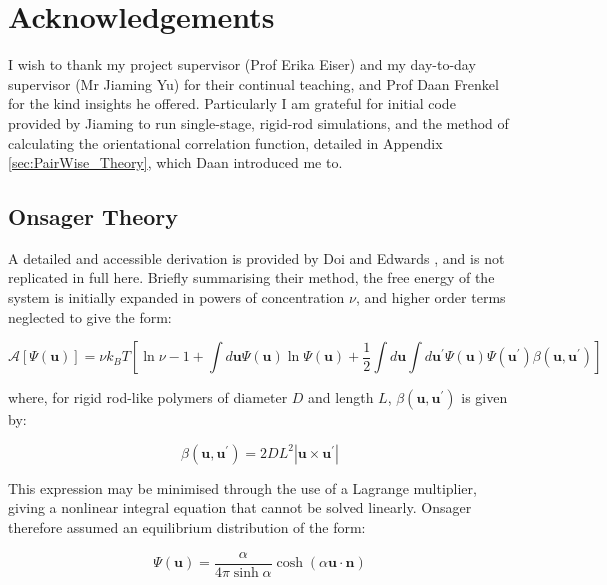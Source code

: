 \documentclass[11pt, a4paper]{article} %
\begin{document}
\section*{Acknowledgements}
I wish to thank my project supervisor (Prof Erika Eiser) and my day-to-day supervisor (Mr Jiaming Yu) for their continual teaching, and Prof Daan Frenkel for the kind insights he offered. Particularly I am grateful for initial code provided by Jiaming to run single-stage, rigid-rod simulations, and the method of calculating the orientational correlation function, detailed in Appendix \ref{sec:PairWise_Theory}, which Daan introduced me to.

\printbibliography

\begin{appendices}

\section{Onsager Theory} \label{sec:OnsagerAppendix}
A detailed and accessible derivation is provided by Doi and Edwards \cite{Doi1988}, and is not replicated in full here. Briefly summarising their method, the free energy of the system is initially expanded in powers of concentration $\nu$, and higher order terms neglected to give the form:

\begin{equation} \label{eq:OnsagerFreeEnergy}
\mathcal{A}[\Psi(\boldsymbol{u})] = \nu k_{B}T \left[ \ln\nu - 1 + \int d\boldsymbol{u} \Psi(\boldsymbol{u}) \ln \Psi(\boldsymbol{u}) + \frac{1}{2} \int d\boldsymbol{u} \int d\boldsymbol{u^{\prime}} \Psi(\boldsymbol{u}) \Psi(\boldsymbol{u^{\prime}}) \beta(\boldsymbol{u}, \boldsymbol{u^{\prime}})  \right]
\end{equation}

where, for rigid rod-like polymers of diameter $D$ and length $L$, $\beta(\boldsymbol{u}, \boldsymbol{u^{\prime}})$ is given by:

\begin{equation}
\beta(\boldsymbol{u}, \boldsymbol{u^{\prime}}) = 2DL^{2} \left\lvert \boldsymbol{u} \times \boldsymbol{u^{\prime}} \right\rvert
\end{equation} 

This expression may be minimised through the use of a Lagrange multiplier, giving a nonlinear integral equation that cannot be solved linearly. Onsager therefore assumed an equilibrium distribution of the form:

\begin{equation}
\Psi(\boldsymbol{u}) = \frac{\alpha}{4\pi\sinh\alpha} \cosh (\alpha \boldsymbol{u} \cdot \boldsymbol{n})
\end{equation}


\end{appendices}
\end{document}
